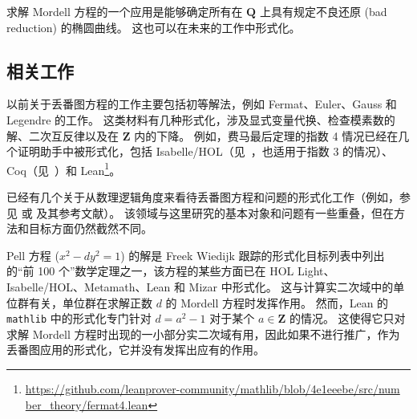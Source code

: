 \documentclass[sigplan,10pt,nonacm,
screen]{acmart} \settopmatter{printfolios=true,printccs=false,printacmref=false}
\newcommand{\ab}[1]{\todo[color=green]{AB: #1}}
\newcommand{\sd}[1]{\todo[color=yellow]{SD: #1}}
\newcommand{\mathlib}{\lstinline{mathlib}\xspace}
\newcommand{\QQ}{\mathbf{Q}}
\newcommand{\ZZ}{\mathbf{Z}}
\begin{document}
求解 Mordell 方程的一个应用是能够确定所有在 $\QQ$ 上具有规定不良还原 (bad reduction) 的椭圆曲线。
这也可以在未来的工作中形式化。

\subsection{相关工作}\label{sec:Related}

以前关于丢番图方程的工作主要包括初等解法，例如 Fermat、Euler、Gauss 和 Legendre 的工作。
这类材料有几种形式化，涉及显式变量代换、检查模素数的解、二次互反律以及在 $\ZZ$ 内的下降。
例如，费马最后定理的指数 4 情况已经在几个证明助手中被形式化，包括 Isabelle/HOL（见~\cite{Oosterhuis}，也适用于指数 3 的情况）、Coq（见~\cite{Diophante-Fermat}）和 Lean\footnote{\href{https://github.com/leanprover-community/mathlib/blob/4e1eeebe/src/number\_theory/fermat4.lean}{https://github.com/leanprover-community/mathlib/blob/4e1eeebe/src/num}\\
\href{https://github.com/leanprover-community/mathlib/blob/4e1eeebe/src/number\_theory/fermat4.lean}{ber\_theory/fermat4.lean}}。

已经有几个关于从数理逻辑角度来看待丢番图方程和问题的形式化工作（例如，参见 \cite{larcheywendling_et_al} 或 \cite{pak_et_al} 及其参考文献）。
该领域与这里研究的基本对象和问题有一些重叠，但在方法和目标方面仍然截然不同。

Pell 方程 ($x^2 -dy^2 =1$) 的解是 Freek Wiedijk 跟踪的形式化目标列表中列出的“前 100 个”数学定理之一，该方程的某些方面已在 HOL Light、Isabelle/HOL、Metamath、Lean 和 Mizar 中形式化。
这与计算实二次域中的单位群有关，单位群在求解正数 $d$ 的 Mordell 方程时发挥作用。
然而，Lean 的 \mathlib 中的形式化专门针对 $d = a^ 2 - 1$ 对于某个 $a \in \ZZ$ 的情况。
这使得它只对求解 Mordell 方程时出现的一小部分实二次域有用，因此如果不进行推广，作为丢番图应用的形式化，它并没有发挥出应有的作用。
\end{document}
